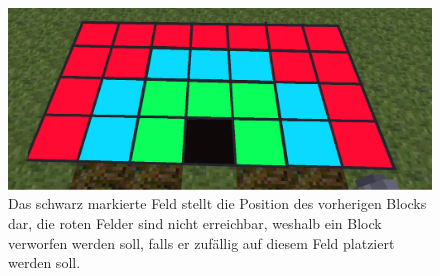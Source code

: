 \begin{figure}
\centering
\includegraphics[scale=0.25]{src/lava_runner/res/1layer.png}
\caption{Das schwarz markierte Feld stellt die Position des vorherigen Blocks dar, die roten Felder sind nicht erreichbar, weshalb ein Block verworfen werden soll, falls er zufällig auf diesem Feld platziert werden soll.}
\end{figure}

